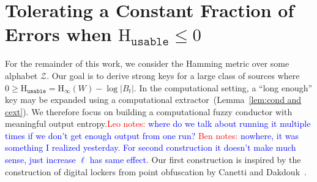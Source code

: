 \documentclass[11pt]{article}
\newcommand{\lemref}[1]{\mbox{Lemma~\ref{#1}}}
\newcommand{\Hoo}{\mathrm{H}_\infty}
\newcommand{\Huse}{\mathrm{H}_{\mathtt{usable}}}
\newcommand{\authnote}[2]{{\textcolor{red}{\textsf{#1 notes: }\textcolor{blue}{ #2}}\marginpar{\textcolor{red}{\textbf{!!!!!}}}}}
\newcommand{\authnote}[2]{}
\newcommand{\bnote}[1]{{\authnote{Ben}{#1}}}
\newcommand{\lnote}[1]{{\authnote{Leo}{#1}}}
\begin{document}
\section{Tolerating a Constant Fraction of Errors when $\Huse\le 0$}
\label{sec:construction}
For the remainder of this work, we consider the Hamming metric over some alphabet $\mathcal{Z}$.  Our goal is to derive strong keys for a large class of sources where $0\ge \Huse = \Hoo(W) - \log|B_t|$.
In the computational setting, a ``long enough'' key may be expanded using a computational extractor~(\lemref{lem:cond and cext}).  We therefore focus on building a computational fuzzy conductor with meaningful output entropy.\lnote{where do we talk about running it multiple times if we don't get enough output from one run?} \bnote{nowhere, it was something I realized yesterday.  For second construction it doesn't make much sense, just increase $\ell$ has same effect.} Our first construction is inspired by the construction of digital lockers from point obfuscation by Canetti and Dakdouk~\cite{canetti2008obfuscating}.
\end{document}
